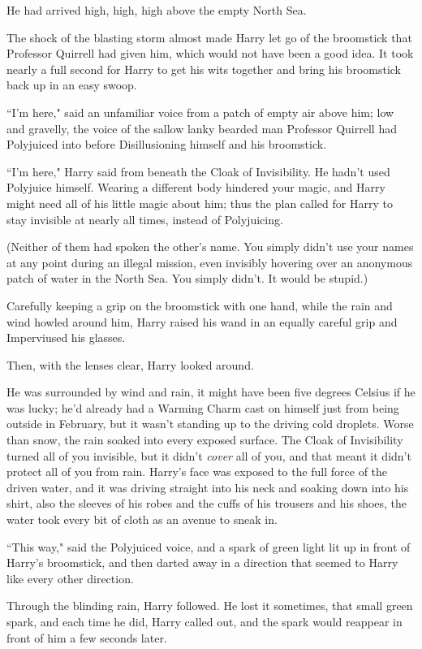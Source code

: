 He had arrived high, high, high above the empty North Sea.

The shock of the blasting storm almost made Harry let go of the broomstick that Professor Quirrell had given him, which would not have been a good idea. It took nearly a full second for Harry to get his wits together and bring his broomstick back up in an easy swoop.

``I'm here," said an unfamiliar voice from a patch of empty air above him; low and gravelly, the voice of the sallow lanky bearded man Professor Quirrell had Polyjuiced into before Disillusioning himself and his broomstick.

``I'm here," Harry said from beneath the Cloak of Invisibility. He hadn't used Polyjuice himself. Wearing a different body hindered your magic, and Harry might need all of his little magic about him; thus the plan called for Harry to stay invisible at nearly all times, instead of Polyjuicing.

(Neither of them had spoken the other's name. You simply didn't use your names at any point during an illegal mission, even invisibly hovering over an anonymous patch of water in the North Sea. You simply didn't. It would be stupid.)

Carefully keeping a grip on the broomstick with one hand, while the rain and wind howled around him, Harry raised his wand in an equally careful grip and Imperviused his glasses.

Then, with the lenses clear, Harry looked around.

He was surrounded by wind and rain, it might have been five degrees Celsius if he was lucky; he'd already had a Warming Charm cast on himself just from being outside in February, but it wasn't standing up to the driving cold droplets. Worse than snow, the rain soaked into every exposed surface. The Cloak of Invisibility turned all of you invisible, but it didn't \emph{cover} all of you, and that meant it didn't protect all of you from rain. Harry's face was exposed to the full force of the driven water, and it was driving straight into his neck and soaking down into his shirt, also the sleeves of his robes and the cuffs of his trousers and his shoes, the water took every bit of cloth as an avenue to sneak in.

``This way," said the Polyjuiced voice, and a spark of green light lit up in front of Harry's broomstick, and then darted away in a direction that seemed to Harry like every other direction.

Through the blinding rain, Harry followed. He lost it sometimes, that small green spark, and each time he did, Harry called out, and the spark would reappear in front of him a few seconds later.


